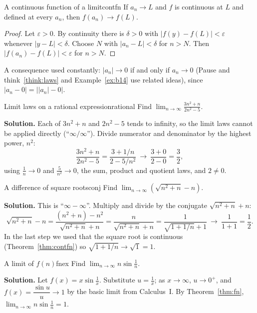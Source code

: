 \documentclass[11pt]{article}
\begin{document}
\begin{thm}{A continuous function of a limit}{contfn}
If $a_n\to L$ and $f$ is continuous at $L$ and defined at every $a_n$, then $f(a_n)\to f(L)$.
\end{thm}
\begin{proof}
Let $\varepsilon>0$. By continuity there is $\delta>0$ with $|f(y)-f(L)|<\varepsilon$ whenever $|y-L|<\delta$. Choose $N$ with $|a_n-L|<\delta$ for $n>N$. Then $|f(a_n)-f(L)|<\varepsilon$ for $n>N$.
\end{proof}

A consequence used constantly: $|a_n|\to0$ if and only if $a_n\to0$ (Pause and think~\ref{think:laws} and Example~\ref{ex:b14} use related ideas), since $|a_n-0|=\big||a_n|-0\big|$.

\begin{exmp}{Limit laws on a rational expression}{rational}
Find $\displaystyle\lim_{n\to\infty}\frac{3n^2+n}{2n^2-5}$.

\textbf{Solution.} Each of $3n^2+n$ and $2n^2-5$ tends to infinity, so the limit laws cannot be applied directly (``$\infty/\infty$''). Divide numerator and denominator by the highest power, $n^2$:
\[
\frac{3n^2+n}{2n^2-5}=\frac{3+1/n}{2-5/n^2}\ \longrightarrow\ \frac{3+0}{2-0}=\frac32,
\]
using $\frac1n\to0$ and $\frac5{n^2}\to0$, the sum, product and quotient laws, and $2\ne0$.
\end{exmp}

\begin{exmp}{A difference of square roots}{conj}
Find $\displaystyle\lim_{n\to\infty}\left(\sqrt{n^2+n}-n\right)$.

\textbf{Solution.} This is ``$\infty-\infty$''. Multiply and divide by the conjugate $\sqrt{n^2+n}+n$:
\[
\sqrt{n^2+n}-n=\frac{(n^2+n)-n^2}{\sqrt{n^2+n}+n}=\frac{n}{\sqrt{n^2+n}+n}=\frac{1}{\sqrt{1+1/n}+1}\ \longrightarrow\ \frac1{1+1}=\frac12 .
\]
In the last step we used that the square root is continuous (Theorem~\ref{thm:contfn}) so $\sqrt{1+1/n}\to\sqrt1=1$.
\end{exmp}

\begin{exmp}{A limit of $f(n)$}{fnex}
Find $\displaystyle\lim_{n\to\infty}n\sin\frac1n$.

\textbf{Solution.} Let $f(x)=x\sin\frac1x$. Substitute $u=\frac1x$; as $x\to\infty$, $u\to0^+$, and $f(x)=\dfrac{\sin u}{u}\to1$ by the basic limit from Calculus~I. By Theorem~\ref{thm:fn}, $\lim_{n\to\infty}n\sin\frac1n=1$.
\end{exmp}
\end{document}
